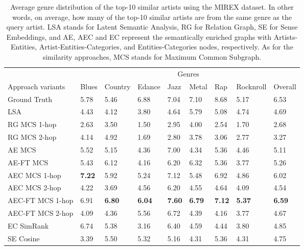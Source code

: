 \begin{table}[ht!]
\centering
	\begin{tabular}{ lllllllll }
 	\toprule
& \multicolumn{8}{c}{Genres} \\
\cmidrule(lr){2-9}
	Approach variants & Blues & Country & Edance & Jazz & Metal & Rap & Rocknroll & Overall\\
	\midrule
Ground Truth & 5.78 & 5.46 & 6.88 & 7.04 & 7.10 & 8.68 & 5.17 & 6.53\\
\midrule[.2pt]
LSA & 4.43 & 4.12 & 3.80 & 4.64 & 5.79 & 5.08 & 4.74 & 4.69\\
RG MCS 1-hop & 2.63 & 3.50 & 1.50 & 2.95 & 4.00 & 2.54 & 1.70 &  2.68\\
RG MCS 2-hop & 4.14 & 4.92 & 1.69 & 2.80 & 3.78 & 3.06 & 2.77 & 3.27\\
AE MCS & 5.52 & 5.15 & 4.36 & 7.00 & 4.34 & 5.36 & 4.46 & 5.11\\
AE-FT MCS & 5.43 & 6.12 & 4.16 & 6.20 & 6.32 & 5.36 & 3.77 & 5.26 \\
AEC MCS 1-hop & \textbf{7.22} & 5.92 & 5.24 & 7.12 & 5.48 & 6.92 & 4.86 & 6.02 \\
AEC MCS 2-hop & 4.22 & 3.69 & 4.56 & 6.20 & 4.55 & 4.64 & 4.09 & 4.54 \\
AEC-FT MCS 1-hop & 6.91 & \textbf{6.80} & \textbf{6.04} & \textbf{7.60} & \textbf{6.79} & \textbf{7.12} & \textbf{5.37} & \textbf{6.59} \\
AEC-FT MCS 2-hop & 4.09 & 4.36 & 5.56 & 6.72 & 4.39 & 4.16 & 3.77 & 4.67 \\
EC SimRank & 6.74 & 5.38 & 3.16 & 6.40 & 4.59 & 4.44 & 3.80 & 4.85 \\
SE Cosine & 3.39 & 5.50 & 5.32 & 5.16 & 4.31 & 5.36 & 4.31 & 4.75 \\
\bottomrule	
	\end{tabular}
	\caption{Average genre distribution of the top-10 similar artists using the MIREX dataset. In other words, on average, how many of the top-10 similar artists are from the same genre as the query artist. LSA stands for Latent Semantic Analysis, RG for Relation Graph, SE for Sense Embeddings,  and AE, AEC and EC represent the semantically enriched graphs with Artists-Entities, Artist-Entities-Categories, and Entities-Categories nodes, respectively. As for the similarity approaches, MCS stands for Maximum Common Subgraph.}	
	\label{tbl:res_genre_distrib}
\end{table}


